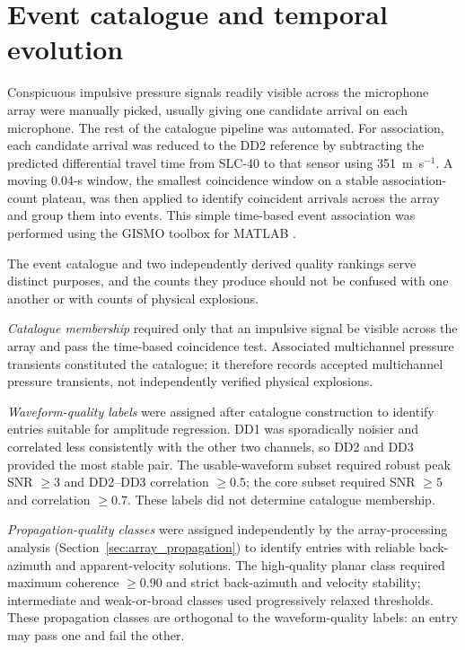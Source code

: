 \documentclass[]{seismica}
\begin{document}
\section{Event catalogue and temporal evolution}
\label{sec:temporal_evolution}

Conspicuous impulsive pressure signals readily visible across the microphone
array were manually picked, usually giving one candidate arrival on each
microphone. The rest of the catalogue pipeline was automated. For association,
each candidate arrival was reduced to the DD2 reference by subtracting the
predicted differential travel time from SLC-40 to that sensor using
351~m~s$^{-1}$. A moving 0.04-s window, the smallest coincidence window on a
stable association-count plateau, was then applied to identify coincident
arrivals across the array and group them into events. This simple time-based
event association was performed using the GISMO toolbox for MATLAB 
\citep{thompson_gismo_2017}.

The event catalogue and two independently derived quality rankings serve
distinct purposes, and the counts they produce should not be confused with
one another or with counts of physical explosions.

\textit{Catalogue membership} required only that an impulsive signal be
visible across the array and pass the time-based coincidence test.
Associated multichannel pressure transients constituted the catalogue; it
therefore records accepted multichannel pressure transients, not
independently verified physical explosions.

\textit{Waveform-quality labels} were assigned after catalogue construction
to identify entries suitable for amplitude regression. DD1 was sporadically
noisier and correlated less consistently with the other two channels, so DD2
and DD3 provided the most stable pair. The usable-waveform subset required
robust peak SNR $\geq3$ and DD2--DD3 correlation $\geq0.5$; the core subset
required SNR $\geq5$ and correlation $\geq0.7$. These labels did not
determine catalogue membership.

\textit{Propagation-quality classes} were assigned independently by the
array-processing analysis (Section~\ref{sec:array_propagation}) to identify
entries with reliable back-azimuth and apparent-velocity solutions. The
high-quality planar class required maximum coherence $\geq0.90$ and strict
back-azimuth and velocity stability; intermediate and weak-or-broad classes
used progressively relaxed thresholds. These propagation classes are
orthogonal to the waveform-quality labels: an entry may pass one and fail
the other.
\end{document}
